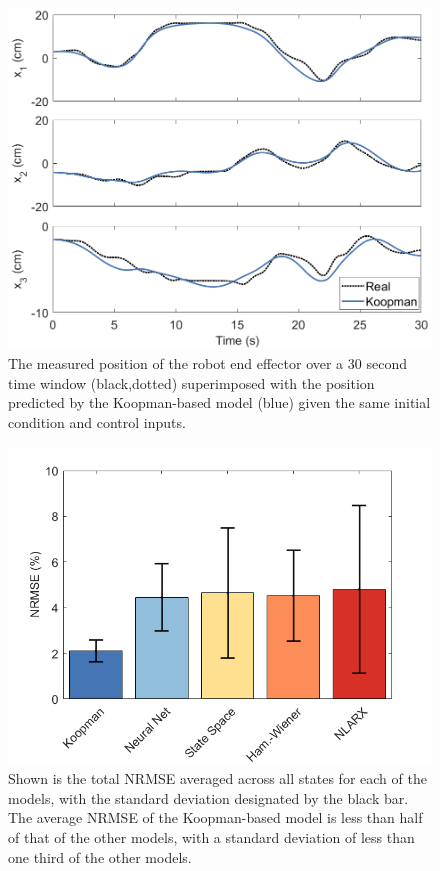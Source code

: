 \begin{figure}
    \centering
    \includegraphics[width=\linewidth]{figures/koopPlot4_cropped.png}
    \caption{
    The measured position of the robot end effector over a 30 second time window (black,dotted) superimposed with the position predicted by the Koopman-based model (blue) given the same initial condition and control inputs.}
    \label{fig:koopmanSim}
\end{figure}

\begin{figure}
    \centering
    \includegraphics[width=\linewidth]{figures/NRMSE2.png}
    \caption{Shown is the total NRMSE averaged across all states for each of the models, with the standard deviation designated by the black bar. The average NRMSE of the Koopman-based model is less than half of that of the other models, with a standard deviation of less than one third of the other models.}
    \label{fig:comparison}
\end{figure}

